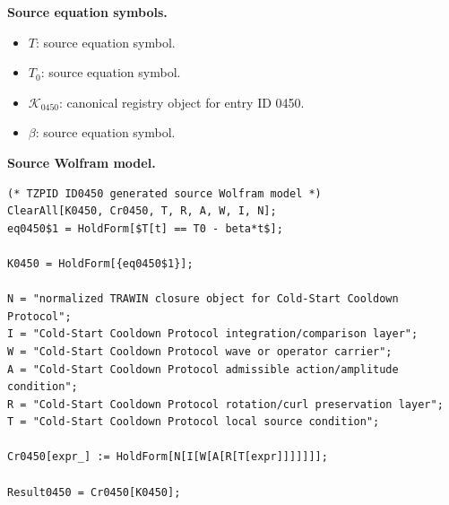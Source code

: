 \begin{minipage}[t]{0.49\linewidth}
\begingroup
\small
\raggedright
\textbf{Source equation symbols.}\par
\begin{itemize}[leftmargin=1.35em,itemsep=1pt,topsep=1pt,parsep=0pt]
    \item $T$: source equation symbol.
    \item $T_{0}$: source equation symbol.
    \item $\mathcal{K}_{0450}$: canonical registry object for entry ID 0450.
    \item $\beta$: source equation symbol.
\end{itemize}
\endgroup
\end{minipage}\hfill
\begin{minipage}[t]{0.47\linewidth}
\begingroup
\scriptsize
\raggedright
\textbf{Source Wolfram model.}\par
\begin{Verbatim}[fontsize=\tiny,breaklines=true,breakanywhere=true]
(* TZPID ID0450 generated source Wolfram model *)
ClearAll[K0450, Cr0450, T, R, A, W, I, N];
eq0450$1 = HoldForm[$T[t] == T0 - beta*t$];

K0450 = HoldForm[{eq0450$1}];

N = "normalized TRAWIN closure object for Cold-Start Cooldown Protocol";
I = "Cold-Start Cooldown Protocol integration/comparison layer";
W = "Cold-Start Cooldown Protocol wave or operator carrier";
A = "Cold-Start Cooldown Protocol admissible action/amplitude condition";
R = "Cold-Start Cooldown Protocol rotation/curl preservation layer";
T = "Cold-Start Cooldown Protocol local source condition";

Cr0450[expr_] := HoldForm[N[I[W[A[R[T[expr]]]]]]];

Result0450 = Cr0450[K0450];
\end{Verbatim}
\endgroup
\end{minipage}

